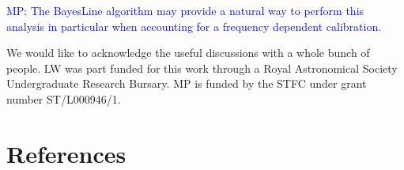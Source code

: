 \documentclass[10pt]{iopart}
\newcommand{\MP}[1]{\textcolor{blue}{MP: #1}}
\begin{document}
\MP{The BayesLine algorithm \cite{2015PhRvD..91h4034L} may provide a natural
way to perform this analysis in particular when accounting for a frequency
dependent calibration.}

\ack

We would like to acknowledge the useful discussions with a whole bunch
of people. LW was part funded for this work through a Royal Astronomical
Society Undergraduate Research Bursary.
MP is funded by the STFC under grant number ST/L000946/1.

\section*{References}



\end{document}
